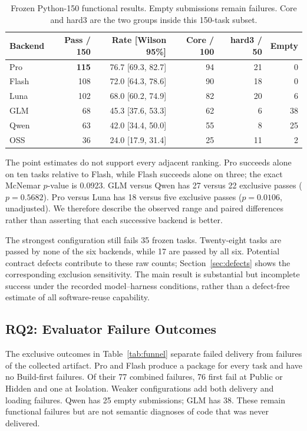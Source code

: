 \documentclass[acmsmall,screen,review,anonymous]{acmart}
\begin{document}
\begin{table}[t]
 \caption{Frozen Python-150 functional results. Empty submissions remain
 failures. Core and hard3 are the two groups inside this 150-task subset.}
 \label{tab:main}
 \centering\small
 \setlength{\tabcolsep}{4pt}
 \begin{tabular}{@{}lrrrrr@{}}
 \toprule
 Backend & Pass / 150 & Rate [Wilson 95\%] & Core / 100 & hard3 / 50 & Empty \\
 \midrule
 Pro & \textbf{115} & 76.7 [69.3, 82.7] & 94 & 21 & 0 \\
 Flash & 108 & 72.0 [64.3, 78.6] & 90 & 18 & 0 \\
 Luna & 102 & 68.0 [60.2, 74.9] & 82 & 20 & 6 \\
 GLM & 68 & 45.3 [37.6, 53.3] & 62 & 6 & 38 \\
 Qwen & 63 & 42.0 [34.4, 50.0] & 55 & 8 & 25 \\
 OSS & 36 & 24.0 [17.9, 31.4] & 25 & 11 & 2 \\
 \bottomrule
 \end{tabular}
\end{table}

The point estimates do not support every adjacent ranking. Pro succeeds alone
on ten tasks relative to Flash, while Flash succeeds alone on three; the exact
McNemar $p$-value is 0.0923. GLM versus Qwen has 27 versus 22 exclusive passes
($p=0.5682$). Pro versus Luna has 18 versus five exclusive passes
($p=0.0106$, unadjusted). We therefore describe the observed range and paired
differences rather than asserting that each successive backend is better.

The strongest configuration still fails 35 frozen tasks. Twenty-eight tasks
are passed by none of the six backends, while 17 are passed by all six. Potential
contract defects contribute to these raw counts; Section~\ref{sec:defects}
shows the corresponding exclusion sensitivity. The main result is substantial
but incomplete success under the recorded model--harness conditions, rather
than a defect-free estimate of all software-reuse capability.

\subsection{RQ2: Evaluator Failure Outcomes}
\label{sec:rq2}

The exclusive outcomes in Table~\ref{tab:funnel} separate failed delivery from
failures of the collected artifact. Pro and Flash produce a package for every
task and have no Build-first failures. Of their 77 combined failures, 76 first
fail at Public or Hidden and one at Isolation. Weaker configurations add both
delivery and loading failures. Qwen has 25 empty submissions; GLM has 38. These
remain functional failures but are not semantic diagnoses of code that was
never delivered.
\end{document}
